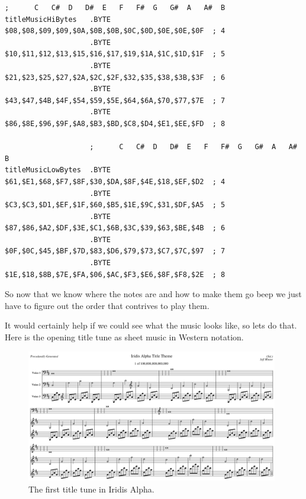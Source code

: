 \begin{lstlisting}[caption=The lookup table for all of the notes used in the theme music. The two lowest available octaves are not
used by the game. To see this for yourself\, compare the first entry in \icode{titleMusicHiBytes}/\icode{titleMusicLowBytes} (\$08 and \$61\,
giving \$0861) with the entry highlighted in red in the previous table.,basicstyle=\tiny]
                    ;      C   C#  D   D#  E   F   F#  G   G#  A   A#  B
titleMusicHiBytes   .BYTE $08,$08,$09,$09,$0A,$0B,$0B,$0C,$0D,$0E,$0E,$0F  ; 4
                    .BYTE $10,$11,$12,$13,$15,$16,$17,$19,$1A,$1C,$1D,$1F  ; 5
                    .BYTE $21,$23,$25,$27,$2A,$2C,$2F,$32,$35,$38,$3B,$3F  ; 6
                    .BYTE $43,$47,$4B,$4F,$54,$59,$5E,$64,$6A,$70,$77,$7E  ; 7
                    .BYTE $86,$8E,$96,$9F,$A8,$B3,$BD,$C8,$D4,$E1,$EE,$FD  ; 8

                    ;      C   C#  D   D#  E   F   F#  G   G#  A   A#  B
titleMusicLowBytes  .BYTE $61,$E1,$68,$F7,$8F,$30,$DA,$8F,$4E,$18,$EF,$D2  ; 4
                    .BYTE $C3,$C3,$D1,$EF,$1F,$60,$B5,$1E,$9C,$31,$DF,$A5  ; 5
                    .BYTE $87,$86,$A2,$DF,$3E,$C1,$6B,$3C,$39,$63,$BE,$4B  ; 6
                    .BYTE $0F,$0C,$45,$BF,$7D,$83,$D6,$79,$73,$C7,$7C,$97  ; 7
                    .BYTE $1E,$18,$8B,$7E,$FA,$06,$AC,$F3,$E6,$8F,$F8,$2E  ; 8
\end{lstlisting}

So now that we know where the notes are and how to make them go beep we just have to figure out the order that 
contrives to play them.

It would certainly help if we could see what the music looks like, so lets do that. Here is the opening title tune as sheet
music in Western notation.

\begin{figure}[H]
{
  \begin{adjustbox}{width=11cm,center}
  \includegraphics[width=11cm]{music/title_no_1_page_1001.png}%
    \end{adjustbox}
}\caption[]{The first title tune in Iridis Alpha.}
\end{figure}

